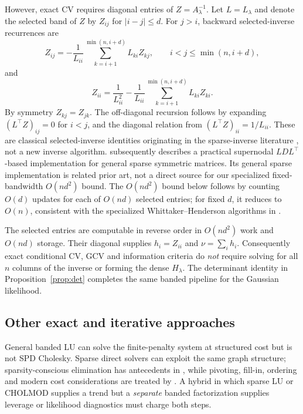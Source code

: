 However, exact CV requires diagonal entries of $Z=A_\lambda^{-1}$. Let $L=L_\lambda$ and denote the selected band of $Z$ by $Z_{ij}$ for $|i-j|\le d$. For $j>i$, backward selected-inverse recurrences are
\begin{equation}\label{eq:seloff}
Z_{ij}=-\frac1{L_{ii}}\sum_{k=i+1}^{\min(n,i+d)}
 L_{ki}Z_{kj},
\qquad i<j\le\min(n,i+d),
\end{equation}
and
\begin{equation}\label{eq:seldiag}
Z_{ii}=\frac{1}{L_{ii}^2}
-\frac{1}{L_{ii}}\sum_{k=i+1}^{\min(n,i+d)}
L_{ki}Z_{ki}.
\end{equation}
By symmetry $Z_{kj}=Z_{jk}$. The off-diagonal recursion follows by expanding $(L^\top Z)_{ij}=0$ for $i<j$, and the diagonal relation from $(L^\top Z)_{ii}=1/L_{ii}$. These are classical selected-inverse identities originating in the sparse-inverse literature \citep{takahashi1973,erisman1975}, not a new inverse algorithm. \citet[Secs.~2--4]{lin2011} subsequently describes a practical supernodal $LDL^\top$-based implementation for general sparse symmetric matrices. Its general sparse implementation is related prior art, not a direct source for our specialized fixed-bandwidth $O(nd^2)$ bound. The $O(nd^2)$ bound below follows by counting $O(d)$ updates for each of $O(nd)$ selected entries; for fixed $d$, it reduces to $O(n)$, consistent with the specialized Whittaker--Henderson algorithms in \citet{weinert2007}.

The selected entries are computable in reverse order in $O(nd^2)$ work and $O(nd)$ storage. Their diagonal supplies $h_i=Z_{ii}$ and $\nu=\sum_i h_i$. Consequently exact conditional CV, GCV and information criteria do \emph{not} require solving for all $n$ columns of the inverse or forming the dense $H_\lambda$. The determinant identity in Proposition~\ref{prop:det} completes the same banded pipeline for the Gaussian likelihood.

\subsection{Other exact and iterative approaches}
General banded LU can solve the finite-penalty system at structured cost but is not SPD Cholesky. Sparse direct solvers can exploit the same graph structure; sparsity-conscious elimination has antecedents in \citet{markowitz1957}, while pivoting, fill-in, ordering and modern cost considerations are treated by \citet{davis2006}. A hybrid in which sparse LU or CHOLMOD supplies a trend but a \emph{separate} banded factorization supplies leverage or likelihood diagnostics must charge both steps.

